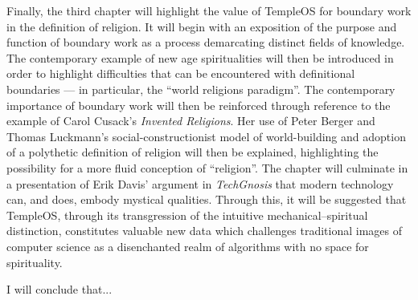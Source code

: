 \documentclass[Draft.tex]{subfiles}
\begin{document}
Finally, the third chapter will highlight the value of TempleOS for
boundary work in the definition of religion.
It will begin with an exposition of the purpose and function of boundary
work as a process demarcating distinct fields of knowledge.
The contemporary example of new age spiritualities will then be
introduced in order to highlight difficulties that can be encountered
with definitional boundaries --- in particular, the ``world religions
paradigm''.
The contemporary importance of boundary work will then be reinforced
through reference to the example of Carol Cusack's \textit{Invented Religions}.
Her use of Peter Berger and Thomas Luckmann's social-constructionist model of
world-building and adoption of a polythetic definition of religion will then
be explained, highlighting the possibility for a more fluid conception of
``religion''.
The chapter will culminate in a presentation of Erik Davis' argument in
\textit{TechGnosis} that modern technology can, and does, embody mystical
qualities.
Through this, it will be suggested that TempleOS, through its transgression
of the intuitive mechanical--spiritual distinction, constitutes valuable
new data which challenges traditional images of
computer science as a disenchanted realm of algorithms with no space for
spirituality.

I will conclude that...
\end{document}
